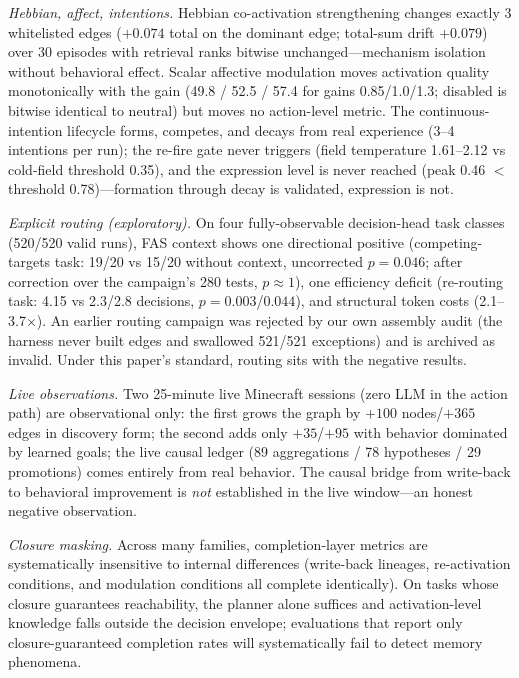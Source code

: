\documentclass[10pt]{article}
\begin{document}
\emph{Hebbian, affect, intentions.} Hebbian co-activation strengthening changes exactly 3 whitelisted edges ($+0.074$ total on the dominant edge; total-sum drift $+0.079$) over 30 episodes with retrieval ranks bitwise unchanged---mechanism isolation without behavioral effect. Scalar affective modulation moves activation quality monotonically with the gain (49.8 / 52.5 / 57.4 for gains 0.85/1.0/1.3; disabled is bitwise identical to neutral) but moves no action-level metric. The continuous-intention lifecycle forms, competes, and decays from real experience (3--4 intentions per run); the re-fire gate never triggers (field temperature 1.61--2.12 vs cold-field threshold 0.35), and the expression level is never reached (peak 0.46 $<$ threshold 0.78)---formation through decay is validated, expression is not.

\emph{Explicit routing (exploratory).} On four fully-observable decision-head task classes (520/520 valid runs), FAS context shows one directional positive (competing-targets task: 19/20 vs 15/20 without context, uncorrected $p{=}0.046$; after correction over the campaign's 280 tests, $p{\approx}1$), one efficiency deficit (re-routing task: 4.15 vs 2.3/2.8 decisions, $p{=}0.003$/$0.044$), and structural token costs (2.1--3.7$\times$). An earlier routing campaign was rejected by our own assembly audit (the harness never built edges and swallowed 521/521 exceptions) and is archived as invalid. Under this paper's standard, routing sits with the negative results.

\emph{Live observations.} Two 25-minute live Minecraft sessions (zero LLM in the action path) are observational only: the first grows the graph by $+100$ nodes/$+365$ edges in discovery form; the second adds only $+35$/$+95$ with behavior dominated by learned goals; the live causal ledger (89 aggregations / 78 hypotheses / 29 promotions) comes entirely from real behavior. The causal bridge from write-back to behavioral improvement is \emph{not} established in the live window---an honest negative observation.

\emph{Closure masking.} Across many families, completion-layer metrics are systematically insensitive to internal differences (write-back lineages, re-activation conditions, and modulation conditions all complete identically). On tasks whose closure guarantees reachability, the planner alone suffices and activation-level knowledge falls outside the decision envelope; evaluations that report only closure-guaranteed completion rates will systematically fail to detect memory phenomena.
\end{document}
